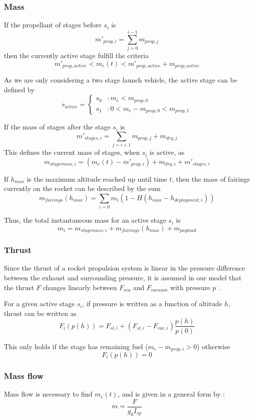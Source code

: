 \documentclass[11pt]{article}
\begin{document}
\subsubsection{Mass}

If the propellant of stages before $s_i$ is
$$
m'_{prop,i} = \sum_{j=0}^{i-1} m_{prop,j}
$$
then the currently active stage fulfill the criteria
$$
m'_{prop,active} < m_e(t) < m'_{prop,active} + m_{prop,active}
$$

As we are only considering a two stage launch vehicle, the active stage can be defined by
$$
s_{active} = \begin{cases} 
  s_0 & : m_e < m_{prop,0} \\
  s_1 & : 0 < m_e - m_{prop,0} < m_{prop,1}
\end{cases}
$$

If the mass of stages after the stage $s_i$ is
$$
m'_{stages,i} = \sum_{j=i+1} m_{prop,j} + m_{dry,j}
$$
This defines the current mass of stages, when $s_{i}$ is active, as
$$
m_{stagemass,i} = \left( m_e(t) - m'_{prop,i} \right) + m_{dry,i} + m'_{stages,i}
$$

If $h_{max}$ is the maximum altitude reached up until time $t$, then the mass of fairings currently on the rocket can be described by the sum
$$
m_{fairings}(h_{max}) = \sum_{i=0} m_i (1 - H(h_{max} - h_{deployment,i}))
$$

Thus, the total instantaneous mass for an active stage $s_i$ is
$$
m_i = m_{stagemass,i} + m_{fairings}(h_{max}) + m_{payload}
$$

\subsubsection{Thrust}

Since the thrust of a rocket propulsion system is linear in the pressure difference between the exhaust and surrounding pressure, 
it is assumed in our model that the thrust $F$ changes linearly between $F_{sea}$ and $F_{vacuum}$ with pressure $p$~\cite{thrust}.
%
%

For a given active stage $s_i$, if pressure is written as a function of altitude $h$, thrust can be written as 
$$
F_i(p(h)) = F_{sl,i} + \left( F_{sl,i} - F_{vac,i} \right) \frac{p(h)}{p(0)}
$$

This only holds if the stage has remaining fuel ($m_e - m_{prop,i} > 0$) 
otherwise 
$$
F_i(p(h)) = 0
$$

\subsubsection{Mass flow}
% 
%
Mass flow is necessary to find $m_e(t)$, and is given in a general form by \cite{massflow}:
$$
\dot{m} = \frac{F}{ g_0 I_{sp}}
$$
\end{document}

